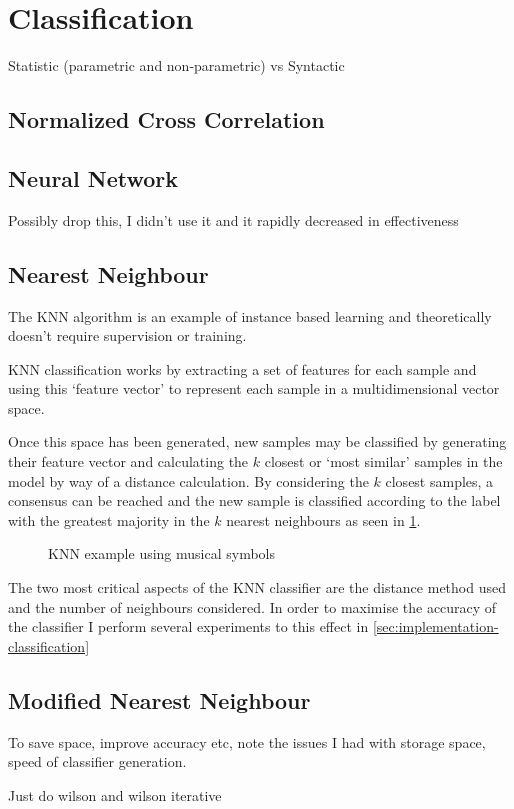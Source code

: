 \section{Classification}

Statistic (parametric and non-parametric) vs Syntactic

\subsection{Normalized Cross Correlation}

\subsection{Neural Network}
Possibly drop this, I didn't use it and it rapidly decreased in effectiveness

\subsection{Nearest Neighbour}

The \acrfull{KNN} algorithm is an example of instance based learning and theoretically doesn't require supervision or training.

KNN classification works by extracting a set of features for each sample and using this `feature vector' to represent each sample in a multidimensional vector space.

Once this space has been generated, new samples may be classified by generating their feature vector and calculating the $k$ closest or `most similar' samples in the model by way of a distance calculation. By considering the $k$ closest samples, a consensus can be reached and the new sample is classified according to the label with the greatest majority in the $k$ nearest neighbours as seen in \cref{fig:knn-example}.

 \begin{figure}[h!]
   \centering
   \caption{KNN example using musical symbols}
   \label{fig:knn-example}
 \end{figure}

The two most critical aspects of the KNN classifier are the distance method used and the number of neighbours considered. In order to maximise the accuracy of the classifier I perform several experiments to this effect in \cref{sec:implementation-classification}

\subsection{Modified Nearest Neighbour}

To save space, improve accuracy etc, note the issues I had with storage space, speed of classifier generation.

Just do wilson and wilson iterative
